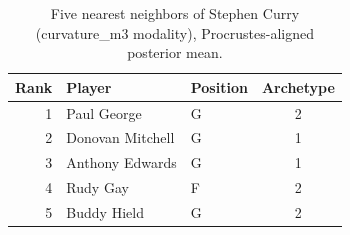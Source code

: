 \begin{table}[htbp]
  \centering\small
  \begin{tabular}{rllc}
    \toprule
    Rank & Player & Position & Archetype \\
    \midrule
    1 & Paul George & G & 2 \\
    2 & Donovan Mitchell & G & 1 \\
    3 & Anthony Edwards & G & 1 \\
    4 & Rudy Gay & F & 2 \\
    5 & Buddy Hield & G & 2 \\
    \bottomrule
  \end{tabular}
  \caption{Five nearest neighbors of Stephen Curry (curvature_m3 modality), Procrustes-aligned posterior mean.}
  \label{tab:Stephen_Curry_neighbors_curvature_m3}
\end{table}

